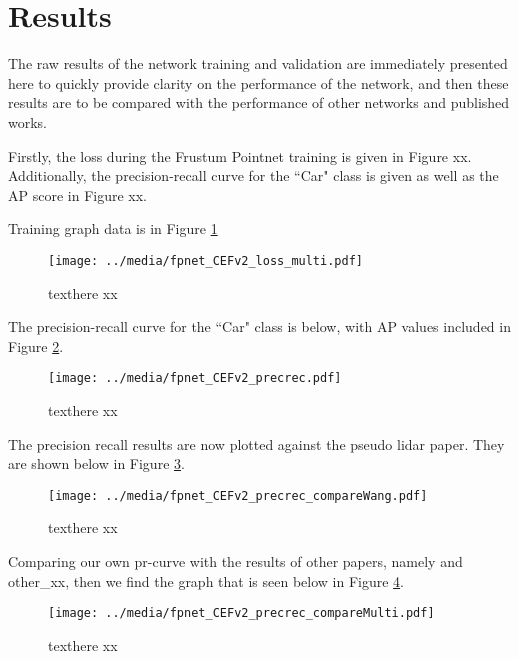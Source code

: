 \section{Results}
The raw results of the network training and validation are immediately presented here to quickly provide clarity on the performance of the network, and then these results are to be compared with the performance of other networks and published works. 

Firstly, the loss during the Frustum Pointnet training is given in Figure xx. Additionally, the precision-recall curve for the ``Car" class is given as well as the AP score in Figure xx. 
 
Training graph data is in Figure \ref{fpnet_CEFv2_loss_multi}
 
\begin{figure}[h]
    \centering
    \texttt{[image: ../media/fpnet\_CEFv2\_loss\_multi.pdf]}
    \caption{texthere xx}
    \label{fpnet_CEFv2_loss_multi} 
\end{figure}


The precision-recall curve for the ``Car" class is below, with AP values included in Figure \ref{fpnet_CEFv2_precrec}.

\begin{figure}[h]
    \centering
    \texttt{[image: ../media/fpnet\_CEFv2\_precrec.pdf]}
    \caption{texthere xx}
    \label{fpnet_CEFv2_precrec}
\end{figure}

The precision recall results are now plotted against the pseudo lidar paper. They are shown below in Figure \ref{fpnet_CEFv2_precrec_compareWang}.

\begin{figure}[h]
    \centering
    \texttt{[image: ../media/fpnet\_CEFv2\_precrec\_compareWang.pdf]}
    \caption{texthere xx}
    \label{fpnet_CEFv2_precrec_compareWang}
\end{figure}


Comparing our own pr-curve with the results of other papers, namely \cite{wang_pseudo-lidar_2019} and other\_xx, then we find the graph that is seen below in Figure \ref{fpnet_CEFv2_precrec_compareMulti}.



\begin{figure}[h]
    \centering
    \texttt{[image: ../media/fpnet\_CEFv2\_precrec\_compareMulti.pdf]}
    \caption{texthere xx}
    \label{fpnet_CEFv2_precrec_compareMulti}
\end{figure}

